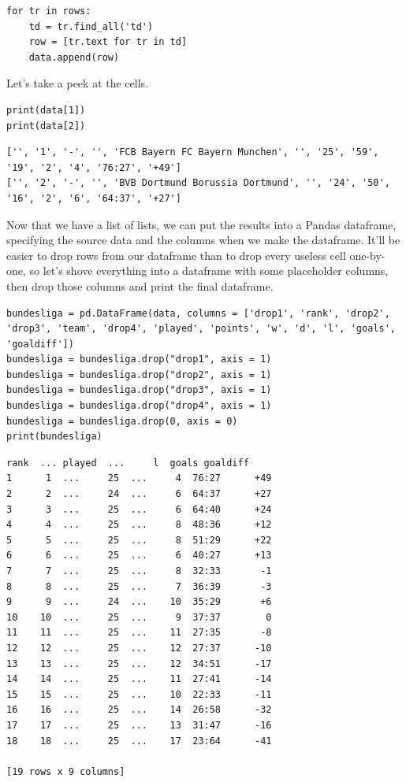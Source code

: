 \begin{lstlisting}[style=pippython]
for tr in rows:
	td = tr.find_all('td')
	row = [tr.text for tr in td]
	data.append(row)
\end{lstlisting}
Let's take a peek at the cells.
\begin{lstlisting}[style=pippython]
print(data[1])
print(data[2])
\end{lstlisting}
\begin{lstlisting}[style=none]
['', '1', '-', '', 'FCB Bayern FC Bayern Munchen', '', '25', '59', '19', '2', '4', '76:27', '+49']
['', '2', '-', '', 'BVB Dortmund Borussia Dortmund', '', '24', '50', '16', '2', '6', '64:37', '+27']
\end{lstlisting}
Now that we have a list of lists, we can put the results into a Pandas dataframe, specifying the source data and the columns when we make the dataframe. It'll be easier to drop rows from our dataframe than to drop every useless cell one-by-one, so let's shove everything into a dataframe with some placeholder columns, then drop those columns and print the final dataframe.\par
\begin{lstlisting}[style=pippython]
bundesliga = pd.DataFrame(data, columns = ['drop1', 'rank', 'drop2', 'drop3', 'team', 'drop4', 'played', 'points', 'w', 'd', 'l', 'goals', 'goaldiff'])
bundesliga = bundesliga.drop("drop1", axis = 1)
bundesliga = bundesliga.drop("drop2", axis = 1)
bundesliga = bundesliga.drop("drop3", axis = 1)
bundesliga = bundesliga.drop("drop4", axis = 1)
bundesliga = bundesliga.drop(0, axis = 0)
print(bundesliga)
\end{lstlisting}
\begin{lstlisting}[style=none]
    rank  ... played  ...     l  goals goaldiff
1      1  ...     25  ...     4  76:27      +49
2      2  ...     24  ...     6  64:37      +27
3      3  ...     25  ...     6  64:40      +24
4      4  ...     25  ...     8  48:36      +12
5      5  ...     25  ...     8  51:29      +22
6      6  ...     25  ...     6  40:27      +13
7      7  ...     25  ...     8  32:33       -1
8      8  ...     25  ...     7  36:39       -3
9      9  ...     24  ...    10  35:29       +6
10    10  ...     25  ...     9  37:37        0
11    11  ...     25  ...    11  27:35       -8
12    12  ...     25  ...    12  27:37      -10
13    13  ...     25  ...    12  34:51      -17
14    14  ...     25  ...    11  27:41      -14
15    15  ...     25  ...    10  22:33      -11
16    16  ...     25  ...    14  26:58      -32
17    17  ...     25  ...    13  31:47      -16
18    18  ...     25  ...    17  23:64      -41

[19 rows x 9 columns]
\end{lstlisting}
